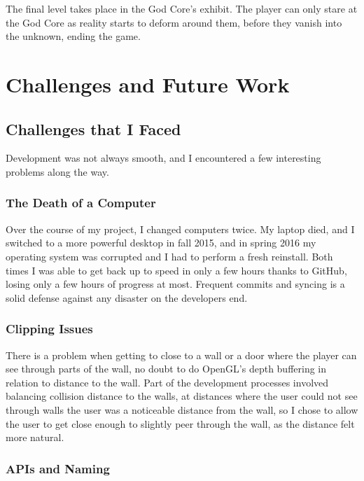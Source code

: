\documentclass{article}
\begin{document}
The final level takes place in the God Core's exhibit. The player can only stare at the God Core as reality starts to deform around them, before they vanish into the unknown, ending the game.

\section{Challenges and Future Work} \label{sec:problemsandfuture}

\subsection{Challenges that I Faced} \label{subsec:challenges}

Development was not always smooth, and I encountered a few interesting problems along the way.

\subsubsection{The Death of a Computer} \label{subsubsec:death}

Over the course of my project, I changed computers twice. My laptop died, and I switched to a more powerful desktop in fall 2015, and in spring 2016 my operating system was corrupted and I had to perform a fresh reinstall. Both times I was able to get back up to speed in only a few hours thanks to GitHub, losing only a few hours of progress at most. Frequent commits and syncing is a solid defense against any disaster on the developers end.

\subsubsection{Clipping Issues} \label{subsubsec:clipping}

There is a problem when getting to close to a wall or a door where the player can see through parts of the wall, no doubt to do OpenGL's depth buffering in relation to distance to the wall. Part of the development processes involved balancing collision distance to the walls, at distances where the user could not see through walls the user was a noticeable distance from the wall, so I chose to allow the user to get close enough to slightly peer through the wall, as the distance felt more natural.

\subsubsection{APIs and Naming} \label{subsubsec:naming}
\end{document}
